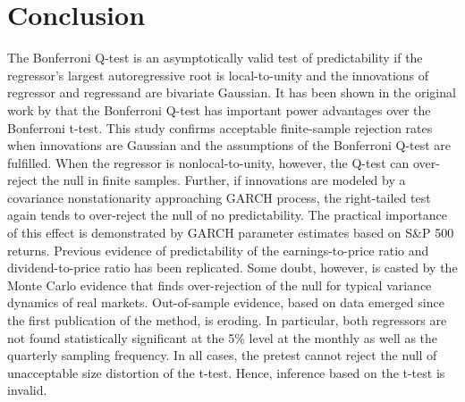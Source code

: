 \documentclass{article}
\begin{document}
\section{Conclusion}
\label{conclusion}

The Bonferroni Q-test is an asymptotically valid test of predictability if the regressor's largest autoregressive root is local-to-unity and the innovations of regressor and regressand are bivariate Gaussian. It has been shown in the original work by \citet{campbell2006efficient} that the Bonferroni Q-test has important power advantages over the Bonferroni t-test. This study confirms acceptable finite-sample rejection rates when innovations are Gaussian and the assumptions of the Bonferroni Q-test are fulfilled. When the regressor is nonlocal-to-unity, however, the Q-test can over-reject the null in finite samples. Further, if innovations are modeled by a covariance nonstationarity approaching GARCH process, the right-tailed test again tends to over-reject the null of no predictability. The practical importance of this effect is demonstrated by GARCH parameter estimates based on S\&P 500 returns. Previous evidence of predictability of the earnings-to-price ratio and dividend-to-price ratio has been replicated. Some doubt, however, is casted by the Monte Carlo evidence that finds over-rejection of the null for typical variance dynamics of real markets. Out-of-sample evidence, based on data emerged since the first publication of the method, is eroding. In particular, both regressors are not found statistically significant at the 5\% level at the monthly as well as the quarterly sampling frequency. In all cases, the pretest cannot reject the null of unacceptable size distortion of the t-test. Hence, inference based on the t-test is invalid. \citet{campbell2005implementing}

\pagebreak


\end{document}
